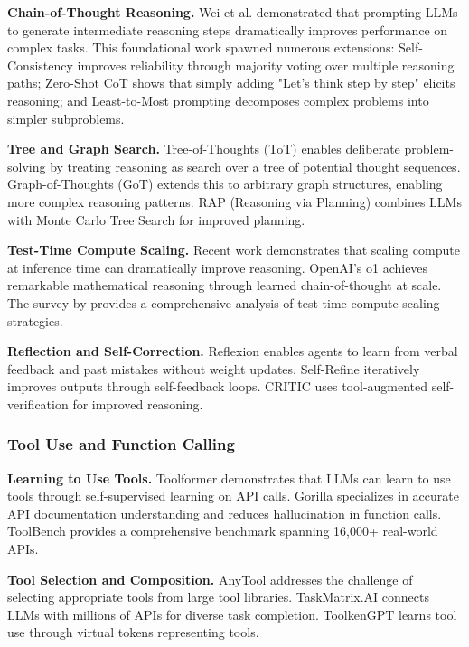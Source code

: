 \documentclass{article}
\theoremstyle{plain}
\theoremstyle{definition}
\theoremstyle{remark}
\begin{document}
\textbf{Chain-of-Thought Reasoning.} Wei et al. \citep{wei2022cot} demonstrated that prompting LLMs to generate intermediate reasoning steps dramatically improves performance on complex tasks. This foundational work spawned numerous extensions: Self-Consistency \citep{wang2023selfconsistency} improves reliability through majority voting over multiple reasoning paths; Zero-Shot CoT \citep{kojima2022large} shows that simply adding "Let's think step by step" elicits reasoning; and Least-to-Most prompting \citep{zhou2022least} decomposes complex problems into simpler subproblems.

\textbf{Tree and Graph Search.} Tree-of-Thoughts (ToT) \citep{yao2024tot} enables deliberate problem-solving by treating reasoning as search over a tree of potential thought sequences. Graph-of-Thoughts (GoT) \citep{besta2024graph} extends this to arbitrary graph structures, enabling more complex reasoning patterns. RAP (Reasoning via Planning) \citep{hao2023rap} combines LLMs with Monte Carlo Tree Search for improved planning.

\textbf{Test-Time Compute Scaling.} Recent work demonstrates that scaling compute at inference time can dramatically improve reasoning. OpenAI's o1 \citep{openai2024o1} achieves remarkable mathematical reasoning through learned chain-of-thought at scale. The survey by \citet{snell2024scaling} provides a comprehensive analysis of test-time compute scaling strategies.

\textbf{Reflection and Self-Correction.} Reflexion \citep{shinn2024reflexion} enables agents to learn from verbal feedback and past mistakes without weight updates. Self-Refine \citep{madaan2024selfrefine} iteratively improves outputs through self-feedback loops. CRITIC \citep{gou2024critic} uses tool-augmented self-verification for improved reasoning.

\subsubsection{Tool Use and Function Calling}

\textbf{Learning to Use Tools.} Toolformer \citep{schick2023toolformer} demonstrates that LLMs can learn to use tools through self-supervised learning on API calls. Gorilla \citep{patil2023gorilla} specializes in accurate API documentation understanding and reduces hallucination in function calls. ToolBench \citep{qin2024toolbench} provides a comprehensive benchmark spanning 16,000+ real-world APIs.

\textbf{Tool Selection and Composition.} AnyTool \citep{du2024anytool} addresses the challenge of selecting appropriate tools from large tool libraries. TaskMatrix.AI \citep{liang2023taskmatrix} connects LLMs with millions of APIs for diverse task completion. ToolkenGPT \citep{hao2024toolken} learns tool use through virtual tokens representing tools.
\end{document}
